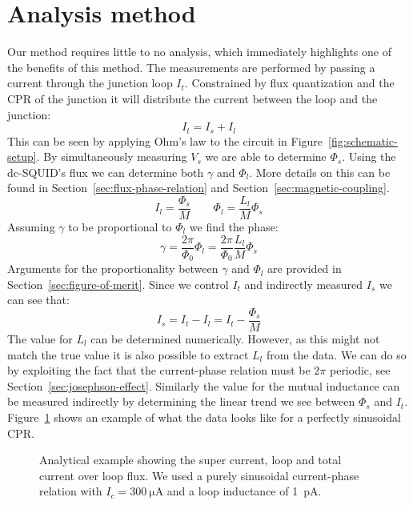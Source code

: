 \section{Analysis method}
Our method requires little to no analysis, which immediately highlights one of the benefits of this method. The measurements are performed by passing a current through the junction loop $I_t$. Constrained by flux quantization and the CPR of the junction it will distribute the current between the loop and the junction:
\begin{equation}
	I_t = I_s + I_l
\end{equation}
This can be seen by applying Ohm's law to the circuit in Figure~\ref{fig:schematic-setup}. By simultaneously measuring $V_s$ we are able to determine $\Phi_s$. Using the dc-SQUID's flux we can determine both $\gamma$ and $\Phi_l$. More details on this can be found in Section~\ref{sec:flux-phase-relation} and Section~\ref{sec:magnetic-coupling}.
\begin{equation}
	I_l = \frac{\Phi_s}{M} \qquad \Phi_l = \frac{L_l}{M}\Phi_s
\end{equation}
Assuming $\gamma$ to be proportional to $\Phi_l$ we find the phase:
\begin{equation}
	\gamma = \frac{2\pi}{\Phi_0}\Phi_l = \frac{2\pi}{\Phi_0}\frac{L_l}{M}\Phi_s
\end{equation}
Arguments for the proportionality between $\gamma$ and $\Phi_l$ are provided in Section~\ref{sec:figure-of-merit}. Since we control $I_t$ and indirectly measured $I_s$ we can see that:
\begin{equation}
	I_s = I_t - I_l = I_t - \frac{\Phi_s}{M}
\end{equation}
The value for $L_l$ can be determined numerically. However, as this might not match the true value it is also possible to extract $L_l$ from the data. We can do so by exploiting the fact that the current-phase relation must be $2\pi$ periodic, see Section~\ref{sec:josephson-effect}. Similarly the value for the mutual inductance can be measured indirectly by determining the linear trend we see between $\Phi_s$ and $I_t$. Figure~\ref{fig:sinusoidal-CPR-prediction} shows an example of what the data looks like for a perfectly sinusoidal CPR. 

\begin{figure}[ht!]
	\centering
	
	\caption{Analytical example showing the super current, loop and total current over loop flux. We used a purely sinusoidal current-phase relation with $I_c=\qty{300}{\micro\ampere}$ and a loop inductance of \qty{1}{\pico\ampere}.}
	\label{fig:sinusoidal-CPR-prediction}
\end{figure}

